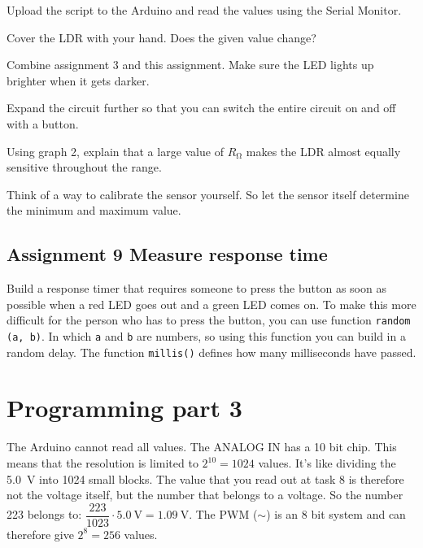 \documentclass{arduino}
\begin{document}
\begin{alphalist}
\item Upload the script to the Arduino and read the values ​​using the Serial Monitor.

\item Cover the LDR with your hand. Does the given value change?

\item Combine assignment 3 and this assignment. Make sure the LED lights up brighter when it gets darker.

\item Expand the circuit further so that you can switch the entire circuit on and off with a button.

\item Using graph 2, explain that a large value of $ R_{\si{\ohm}} $ makes the LDR almost equally sensitive throughout the range.

\item Think of a way to calibrate the sensor yourself. So let the sensor itself determine the minimum and maximum value.
\end{alphalist}


\subsection{Assignment 9 Measure response time}

Build a response timer that requires someone to press the button as soon as possible when a red LED goes out and a green LED comes on. To make this more difficult for the person who has to press the button, you can use function \lstinline{random (a, b)}. In which \lstinline{a} and \lstinline{b} are numbers, so using this function you can build in a random delay. The function \lstinline{millis()} defines how many milliseconds have passed.

\newpage

\section{Programming part 3}


The Arduino cannot read all values. The ANALOG IN has a 10 bit chip. This means that the resolution is limited to $ 2^{10} = 1024 $ values. It's like dividing the \SI{5.0}{\volt} into 1024 small blocks. The value that you read out at task 8 is therefore not the voltage itself, but the number that belongs to a voltage. So the number 223 belongs to: $ \dfrac{223}{1023} \cdot \SI{5.0}{\volt} = \SI{1.09}{\volt} $. The PWM ($\sim$) is an 8 bit system and can therefore give $ 2^8 = 256 $ values.
\end{document}
